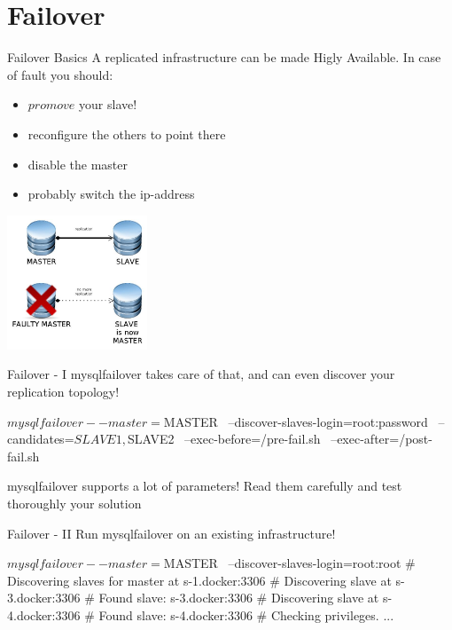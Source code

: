 \documentclass{beamer}[10]
\begin{document}
\section{Failover}
\begin{pyframe}{Failover Basics}
A replicated infrastructure can be made Higly Available.
In case of fault you should:
 \begin{itemize}
 \item $promove$ your slave!
 \item reconfigure the others to point there
 \item disable the master
 \item probably switch the ip-address
 \end{itemize}
\includegraphics[height=4cm]{images/mysql-promote-slave.jpg}

\end{pyframe}

\begin{pyframe}{Failover - I}
mysqlfailover takes care of that, and can even discover your
replication topology!

\begin{bashcode}
$ mysqlfailover --master=$MASTER \
    --discover-slaves-login=root:password \
    --candidates=$SLAVE1,$SLAVE2 \
    --exec-before=/pre-fail.sh \
    --exec-after=/post-fail.sh
\end{bashcode}
{\large
    mysqlfailover supports a lot of parameters!
    Read them carefully and test thoroughly your
    solution
    }
\end{pyframe}


\begin{pyframe}{Failover - II}
Run mysqlfailover on an existing infrastructure!
\begin{bashcode}
$ mysqlfailover --master=$MASTER \
 --discover-slaves-login=root:root
# Discovering slaves for master at s-1.docker:3306
# Discovering slave at s-3.docker:3306
# Found slave: s-3.docker:3306
# Discovering slave at s-4.docker:3306
# Found slave: s-4.docker:3306
# Checking privileges.
...
\end{bashcode}
\end{pyframe}
\end{document}

